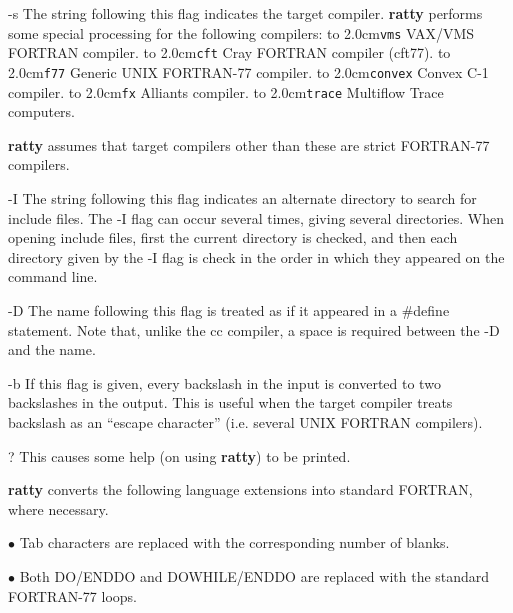\item{-s} The string following this flag indicates the target compiler.
{\bf ratty} performs some special processing for the following
compilers: \newline
{\parskip=0pt
\def\bbox#1{\hbox to 2.0cm{#1\hfil}}
\bbox{\tt vms} VAX/VMS FORTRAN compiler. \newline
\bbox{\tt cft} Cray FORTRAN compiler (cft77). \newline
\bbox{\tt f77} Generic UNIX FORTRAN-77 compiler. \newline
\bbox{\tt convex} Convex C-1 compiler. \newline
\bbox{\tt fx} Alliants compiler. \newline
\bbox{\tt trace} Multiflow Trace computers. \newline
}

{\bf ratty} assumes that target compilers other than these are strict
FORTRAN-77 compilers.

\item{-I} The string following this flag indicates an alternate directory to
search for include files. The -I flag can occur several times, giving several
directories. When opening include files, first the current directory is
checked, and then each directory given by the -I flag is check in the order
in which they appeared on the command line.

\item{-D} The name following this flag is treated as if it appeared in a
\#define statement. Note that, unlike the cc compiler, a space is required
between the -D and the name.

\item{-b} If this flag is given, every backslash in the input is converted to
two backslashes in the output. This is useful when the target compiler
treats backslash as an ``escape character'' (i.e. several UNIX FORTRAN
compilers).

\item{?} This causes some help (on using {\bf ratty}) to be printed.


{\bf ratty} converts the following language extensions into
standard FORTRAN, where necessary.

\item{$\bullet$} Tab characters are replaced with the corresponding
number of blanks.

\item{$\bullet$} Both DO/ENDDO and DOWHILE/ENDDO are replaced with the
standard FORTRAN-77 loops.

